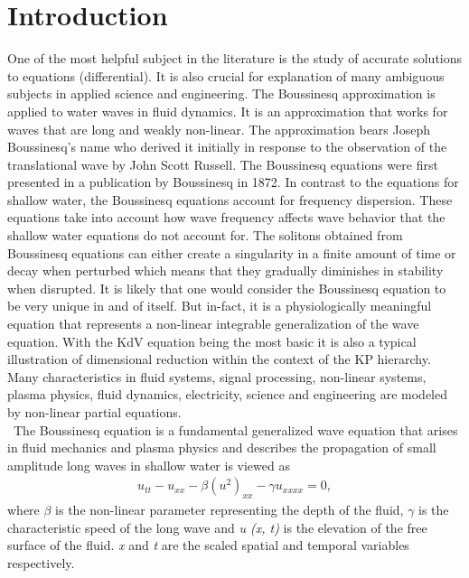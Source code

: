 \documentclass{article}
\numberwithin{equation}{section}
\begin{document}
\section{Introduction}
\noindent One of the most helpful subject in the literature is the study of accurate solutions to equations (differential). It is also crucial for explanation of many ambiguous subjects in applied science and engineering. The Boussinesq approximation is applied to water waves in fluid dynamics. It is an approximation that works for waves that are long and weakly non-linear. The approximation bears Joseph Boussinesq's name who derived it initially in response to the observation of the translational wave by  John Scott Russell. The Boussinesq equations were first presented in a publication by Boussinesq in 1872. In contrast to the equations for shallow water, the Boussinesq equations account for frequency dispersion. These equations take into account how wave frequency affects wave behavior that the shallow water equations do not account for. The solitons obtained from Boussinesq equations can either create a singularity in a finite amount of time or decay when perturbed which means that they gradually diminishes in stability when disrupted. It is likely that one would consider the Boussinesq equation to be very unique in and of itself. But in-fact, it is a physiologically meaningful equation that represents a non-linear integrable generalization of the wave equation. With the KdV equation being the most basic it is also a typical illustration of dimensional reduction within the context of the KP hierarchy. Many characteristics in fluid systems, signal processing, non-linear systems, plasma physics, fluid dynamics, electricity, science and engineering are modeled by non-linear partial equations.\\\
The Boussinesq equation is a fundamental generalized wave equation that arises in fluid mechanics and plasma physics and describes the propagation of small amplitude long waves in shallow water is viewed as
\begin{eqnarray}
u_{tt}-u_{xx}-\beta(u^2)_{xx}-\gamma u_{xxxx}=0,
\end{eqnarray}
where $\beta$ is the non-linear parameter representing the depth of the fluid, $\gamma$ is the characteristic speed of the long wave and \emph{u (x, t)} is the elevation of the free surface of the fluid. \emph{x} and \emph{t} are the scaled spatial and temporal variables respectively.\\\
\end{document}
